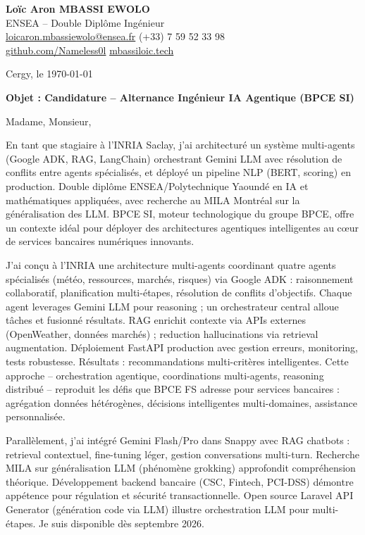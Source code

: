 \documentclass[a4paper,11pt]{article}
\begin{document}
\noindent \textbf{Lo\"ic Aron MBASSI EWOLO} \\
ENSEA -- Double Dipl\^ome Ing\'enieur \\
\href{mailto:loicaron.mbassiewolo@ensea.fr}{loicaron.mbassiewolo@ensea.fr} \quad (+33) 7 59 52 33 98 \\
\href{https://github.com/Nameless0l}{github.com/Nameless0l} \quad \href{https://mbassiloic.tech}{mbassiloic.tech}

\vspace{1em}
\noindent Cergy, le \today

\vspace{1em}
\noindent \textbf{Objet : Candidature -- Alternance Ingénieur IA Agentique (BPCE SI)}

\vspace{1.5em}
\noindent Madame, Monsieur,

\vspace{0.8em}
\noindent En tant que stagiaire à l'INRIA Saclay, j'ai architecturé un système multi-agents (Google ADK, RAG, LangChain) orchestrant Gemini LLM avec résolution de conflits entre agents spécialisés, et déployé un pipeline NLP (BERT, scoring) en production. Double diplôme ENSEA/Polytechnique Yaoundé en IA et mathématiques appliquées, avec recherche au MILA Montréal sur la généralisation des LLM. BPCE SI, moteur technologique du groupe BPCE, offre un contexte idéal pour déployer des architectures agentiques intelligentes au cœur de services bancaires numériques innovants.

\vspace{0.8em}
\noindent J'ai conçu à l'INRIA une architecture multi-agents coordinant quatre agents spécialisés (météo, ressources, marchés, risques) via Google ADK : raisonnement collaboratif, planification multi-étapes, résolution de conflits d'objectifs. Chaque agent leverages Gemini LLM pour reasoning ; un orchestrateur central alloue tâches et fusionné résultats. RAG enrichit contexte via APIs externes (OpenWeather, données marchés) ; reduction hallucinations via retrieval augmentation. Déploiement FastAPI production avec gestion erreurs, monitoring, tests robustesse. Résultats : recommandations multi-critères intelligentes. Cette approche -- orchestration agentique, coordinations multi-agents, reasoning distribué -- reproduit les défis que BPCE FS adresse pour services bancaires : agrégation données hétérogènes, décisions intelligentes multi-domaines, assistance personnalisée.

\vspace{0.8em}
\noindent Parallèlement, j'ai intégré Gemini Flash/Pro dans Snappy avec RAG chatbots : retrieval contextuel, fine-tuning léger, gestion conversations multi-turn. Recherche MILA sur généralisation LLM (phénomène grokking) approfondit compréhension théorique. Développement backend bancaire (CSC, Fintech, PCI-DSS) démontre appétence pour régulation et sécurité transactionnelle. Open source Laravel API Generator (génération code via LLM) illustre orchestration LLM pour multi-étapes. Je suis disponible dès septembre 2026.
\end{document}
